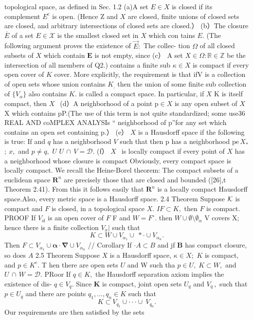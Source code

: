 topological space, as defined in Sec. 1.2 (a)A set $\scriptstyle{E\in X}$ is closed if its complement $E^{\mathrm{c}}$ is open. (Hence Z and $\textstyle X$ are closed, finite unions of closed sets are closed, and arbitrary intersections of closed sets are closed.） (b）The closure $\overline{{E}}$ of a set $\scriptstyle{E\in{\mathcal{X}}}$ is the smallest closed set in $X$ which con tains $E.$ (The following argument proves the existence of ${\overrightarrow{E}}{\mathrm{:}}$ The collec- tion $\Omega$ of all closed subsets of $X$ which contain $\boldsymbol{E}$ is not empty, since (c） A set $X\in\Omega\colon\mathbb{R}\in\mathbb{Z}$ be the intersection of all members of Q2.) contains a finite sub $\kappa\in X$ is compact if every open cover of $\textstyle K$ cover. More explicitly, the requirement is that if{V} is a collection of open sets whose union contains $K_{\mathrm{{,}}}$ then the union of some finite sub collection of $\{V_{\alpha}\}$ also contains $K.$ is called a compact space. In particular, if $X$ K is itself compact, then $\textstyle X{\ ~}$ (d）A neighborhood of a point ${\mathrm{p}}\in X$ is any open subset of $X$ X which contains pP.(The use of this term is not quite standardized; some use36 REAL AND coMPLEX ANALYSIs “ neighborhood of p”for any set which contains an open set containing p.） (e） $X$ is a Hausdorff space if the following is true: If and $\boldsymbol{\mathit{q}}$ has a neighborhood ${\mathbf{}}V$ such that then p has a neighborhood ${\mathrm{pe}}\,X_{*}$ ${\mathrm{;~}}x,$ and $p\neq q,$ $U$ $U\,\cap\,V=\mathcal{D}.$ (f） $\textstyle X{\ ~}$ is locally compact if every point of $X$ has a neighborhood whose closure is compact Obviously, every compact space is locally compact. We recall the Heine-Borel theorem: The compact subsets of a euclidean space ${\boldsymbol{R}}^{n}$ are precisely those that are closed and bounded ([26],t Theorem 2.41). From this it follows easily that ${\boldsymbol{R}}^{n}$ is a locally compact Hausdorff space.Also, every metric space is a Hausdorff space. 2.4 Theorem Suppose ${\cal K}$ is compact and ${\mathbf{}}F$ is closed, in a topological space $X.$ $I F\subset K,$ then ${\mathbf{}}F$ is compact. PROOF If $\scriptstyle V_{\mathrm{sl}}$ is an open cover of ${\mathbf{}}F$ F and $W=F^{\circ}.$ then $W\cup\emptyset\setminus\emptyset_{\alpha}$ V covers X; hence there is a finite collection $\scriptstyle V_{x}|$ such that $$ K\subset W\cup V_{\alpha_{1}}\cup\ *\cdot\cup V_{\alpha_{n}}. $$ Then $F\subset V_{\alpha_{1}}\cup\mathbf{\alpha}\cdot\mathbf{\nabla}\cup V_{\alpha_{n}}$ // Corollary If $\cdot A\subset B$ and jf $\boldsymbol{B}$ has compact closure, so does $\scriptstyle A$ 2.5 Theorem Suppose $X$ is a Hausdorff space, $\kappa\in X;$ $\textstyle K$ is compact, and $p\in K^{c}.$ T hen there are open sets $U$ and W such tha $p\in U,\;K\subset W,$ and $U\,\cap\,W={\mathcal{D}}.$ PRoor If $q\in K,$ the Hausdorff separation axiom implies the existence of dis- $q\in V_{q}.$ Since ${\boldsymbol{K}}$ is compact, joint open sets $U_{q}$ and $V_{q}\,,$ such that $p\in U_{q}$ and there are points $q_{1},\dots,q_{n}\in K$ such that $$ K\subset V_{q_{1}}\cup\cdot\cdot\cdot\cup\ V_{q_{n}}. $$ Our requirements are then satisfied by the sets $$ 